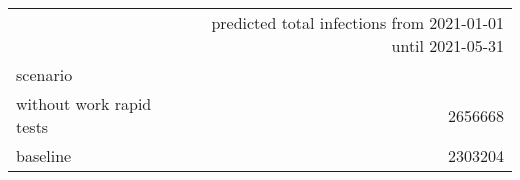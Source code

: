\begin{tabular}{lr}
\toprule
{} &  predicted total infections from 2021-01-01 until 2021-05-31 \\
scenario                  &                                                              \\
\midrule
 without work rapid tests &                                            2656668 \\
 baseline                 &                                            2303204 \\
\bottomrule
\end{tabular}
